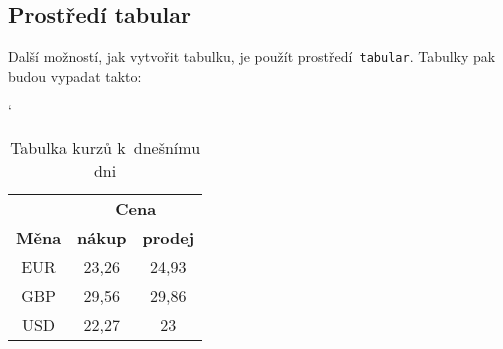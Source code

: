 \documentclass[a4paper, 11pt]{article}
\begin{document}
\subsection{Prostředí tabular}
Další možností, jak vytvořit tabulku, je použít prostředí\texttt{ tabular}. Tabulky pak
budou vypadat takto\footnotemark:

\bigskip
\begin{table}[h]
	\catcode`
	\centering
	\begin{tabular}{|c|c|c|}
		\hline
		~             & \multicolumn{2}{c|}{\textbf{Cena}}                   \\
		\cline{2-3}
		\textbf{Měna} & \textbf{nákup}                     & \textbf{prodej} \\
		\hline
		EUR           & 23,26                              & 24,93           \\
		GBP           & 29,56                              & 29,86           \\
		USD           & 22,27                              & 23              \\
		\hline
	\end{tabular}
	\caption{Tabulka kurzů k~dnešnímu dni}
	\label{table:kurzy}
\end{table}
\bigskip
\end{document}
